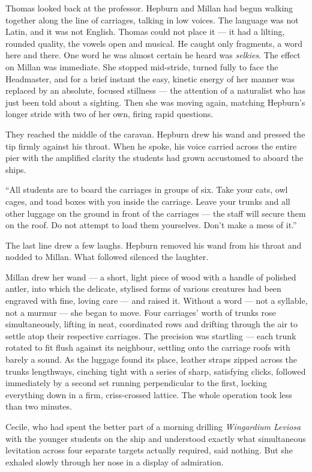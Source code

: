 Thomas looked back at the professor. Hepburn and Millan had begun walking together along the line of carriages, talking in low voices. The language was not Latin, and it was not English. Thomas could not place it --- it had a lilting, rounded quality, the vowels open and musical. He caught only fragments, a word here and there. One word he was almost certain he heard was \textit{selkies}. The effect on Millan was immediate. She stopped mid-stride, turned fully to face the Headmaster, and for a brief instant the easy, kinetic energy of her manner was replaced by an absolute, focused stillness --- the attention of a naturalist who has just been told about a sighting. Then she was moving again, matching Hepburn's longer stride with two of her own, firing rapid questions.
 
They reached the middle of the caravan. Hepburn drew his wand and pressed the tip firmly against his throat. When he spoke, his voice carried across the entire pier with the amplified clarity the students had grown accustomed to aboard the ships.
 
\enquote{All students are to board the carriages in groups of six. Take your cats, owl cages, and toad boxes with you inside the carriage. Leave your trunks and all other luggage on the ground in front of the carriages --- the staff will secure them on the roof. Do not attempt to load them yourselves. Don't make a mess of it.}
 
The last line drew a few laughs. Hepburn removed his wand from his throat and nodded to Millan. What followed silenced the laughter.
 
Millan drew her wand --- a short, light piece of wood with a handle of polished antler, into which the delicate, stylised forms of various creatures had been engraved with fine, loving care --- and raised it. Without a word --- not a syllable, not a murmur --- she began to move. Four carriages' worth of trunks rose simultaneously, lifting in neat, coordinated rows and drifting through the air to settle atop their respective carriages. The precision was startling --- each trunk rotated to fit flush against its neighbour, settling onto the carriage roofs with barely a sound. As the luggage found its place, leather straps zipped across the trunks lengthways, cinching tight with a series of sharp, satisfying clicks, followed immediately by a second set running perpendicular to the first, locking everything down in a firm, criss-crossed lattice. The whole operation took less than two minutes.
 
Cecile, who had spent the better part of a morning drilling \textit{Wingardium Leviosa} with the younger students on the ship and understood exactly what simultaneous levitation across four separate targets actually required, said nothing. But she exhaled slowly through her nose in a display of admiration.
 
